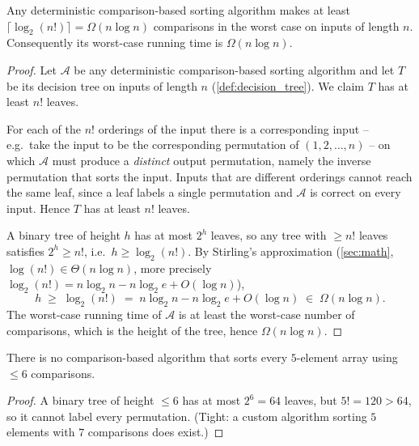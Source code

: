 \begin{theorem}
\label{thm:sort_lower_bound}
Any deterministic comparison-based sorting algorithm makes at least $\lceil \log_2(n!) \rceil = \Omega(n \log n)$ comparisons in the worst case on inputs of length $n$. Consequently its worst-case running time is $\Omega(n \log n)$.
\end{theorem}

\begin{proof}
Let $\mathcal{A}$ be any deterministic comparison-based sorting algorithm and let $T$ be its decision tree on inputs of length $n$ (\cref{def:decision_tree}). We claim $T$ has at least $n!$ leaves.

For each of the $n!$ orderings of the input there is a corresponding input -- e.g.\ take the input to be the corresponding permutation of $(1, 2, \dots, n)$ -- on which $\mathcal{A}$ must produce a \emph{distinct} output permutation, namely the inverse permutation that sorts the input. Inputs that are different orderings cannot reach the same leaf, since a leaf labels a single permutation and $\mathcal{A}$ is correct on every input. Hence $T$ has at least $n!$ leaves.

A binary tree of height $h$ has at most $2^h$ leaves, so any tree with $\ge n!$ leaves satisfies $2^h \ge n!$, i.e.\ $h \ge \log_2(n!)$. By Stirling's approximation (\cref{sec:math}, $\log(n!) \in \Theta(n \log n)$, more precisely $\log_2(n!) = n \log_2 n - n \log_2 e + O(\log n)$),
\[
  h \;\ge\; \log_2(n!) \;=\; n \log_2 n - n \log_2 e + O(\log n) \;\in\; \Omega(n \log n).
\]
The worst-case running time of $\mathcal{A}$ is at least the worst-case number of comparisons, which is the height of the tree, hence $\Omega(n \log n)$.
\end{proof}

\begin{corollary}
\label{cor:five_comparisons}
There is no comparison-based algorithm that sorts every $5$-element array using $\le 6$ comparisons.
\end{corollary}

\begin{proof}
\sketchproof A binary tree of height $\le 6$ has at most $2^6 = 64$ leaves, but $5! = 120 > 64$, so it cannot label every permutation. (Tight: a custom algorithm sorting $5$ elements with $7$ comparisons does exist.)
\end{proof}

